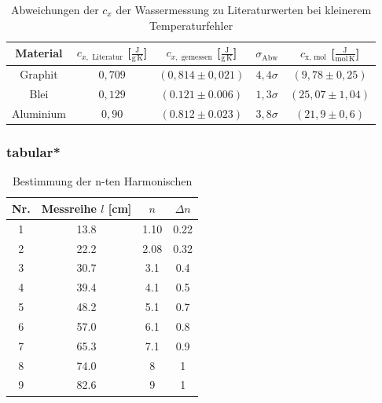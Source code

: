 \begin{table}[h!]
\centering
\begin{tabular}{|c|c|c|c|c|}
\hline
Material & $c_{x,\text{ Literatur}}$ [$\frac{\mathrm{J}}{\mathrm{g\,K}}$] & $c_{x,\text{ gemessen}}$  [$\frac{\mathrm{J}}{\mathrm{g\,K}}$] & $\sigma_{\mathrm{Abw}}$ & $c_{\mathrm{x,\,mol}}$  [$\frac{\mathrm{J}}{\mathrm{mol\,K}}$]\\
\hline
Graphit & $0,709$ & $(0,814\pm0,021)$ & $4,4\sigma$ & $(9,78\pm0,25)$\\
Blei & $0,129$& $(0.121\pm0.006)$ & $1,3\sigma$ & $(25,07\pm1,04)$\\
Aluminium & $0,90$ & $(0.812\pm0.023)$ & $3,8\sigma$ & $(21,9\pm0,6)$\\
\hline
\end{tabular}
\caption{Abweichungen der $c_x$ der Wassermessung zu Literaturwerten bei kleinerem Temperaturfehler}
\label{table:c_x_<t}
\end{table}
\clearpage

\subsubsection{tabular*}
\begin{table}[htbp]
\centering
\begin{tabular*}{0.6\textwidth}{c @{\extracolsep{\fill}} S[table-format=2.1] S[table-format=1.2] S[table-format=1.2] }
\toprule
Nr. & {Messreihe $l$ [\unit{\cm}]} & { $n$ } & { $\Delta n$ } \\
 & 13.8    &    1.10     & 0.22\\
2 & 22.2    &     2.08   &  0.32\\
3 & 30.7    &     3.1    & 0.4 \\
4 & 39.4    &      4.1   & 0.5 \\
5 & 48.2    &      5.1   & 0.7\\
6 & 57.0      &      6.1  & 0.8\\
7 & 65.3    &      7.1  & 0.9\\
8 & 74.0      &     8   & 1 \\
9 & 82.6    &      9   &1 \\
\bottomrule
\end{tabular*}
\caption{Bestimmung der n-ten Harmonischen}
\label{table:Mode}
\end{table}

